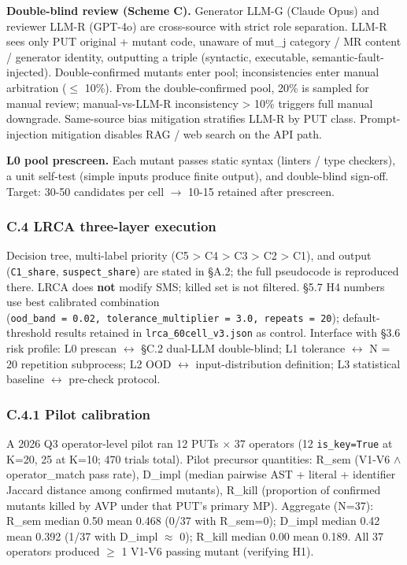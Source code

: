 \documentclass[review,12pt,authoryear]{elsarticle}
\begin{document}
\textbf{Double-blind review (Scheme C).} Generator LLM-G (Claude Opus)
and reviewer LLM-R (GPT-4o) are cross-source with strict role
separation. LLM-R sees only PUT original + mutant code, unaware of
mut\_j category / MR content / generator identity, outputting a triple
(syntactic, executable, semantic-fault-injected). Double-confirmed
mutants enter pool; inconsistencies enter manual arbitration ($\leq$ 10\%).
From the double-confirmed pool, 20\% is sampled for manual review;
manual-vs-LLM-R inconsistency \textgreater{} 10\% triggers full manual
downgrade. Same-source bias mitigation stratifies LLM-R by PUT class.
Prompt-injection mitigation disables RAG / web search on the API path.

\textbf{L0 pool prescreen.} Each mutant passes static syntax (linters /
type checkers), a unit self-test (simple inputs produce finite output),
and double-blind sign-off. Target: 30-50 candidates per cell $\to$ 10-15
retained after prescreen.

\subsubsection{C.4 LRCA three-layer execution}\label{c.4-lrca-three-layer-execution-full}

Decision tree, multi-label priority (C5 \textgreater{} C4 \textgreater{}
C3 \textgreater{} C2 \textgreater{} C1), and output (\texttt{C1\_share},
\texttt{suspect\_share}) are stated in §A.2; the full pseudocode is
reproduced there. LRCA does \textbf{not} modify SMS; killed set is not
filtered. §5.7 H4 numbers use best calibrated combination
(\texttt{ood\_band\ =\ 0.02,\ tolerance\_multiplier\ =\ 3.0,\ repeats\ =\ 20});
default-threshold results retained in \texttt{lrca\_60cell\_v3.json} as
control. Interface with §3.6 risk profile: L0 prescan $\leftrightarrow$ §C.2 dual-LLM
double-blind; L1 tolerance $\leftrightarrow$ N = 20 repetition subprocess; L2 OOD $\leftrightarrow$
input-distribution definition; L3 statistical baseline $\leftrightarrow$ pre-check
protocol.

\subsubsection{C.4.1 Pilot calibration}\label{c.4.1-pilot-calibration-37-operators-k-1020}

A 2026 Q3 operator-level pilot ran 12 PUTs $\times$ 37 operators (12
\texttt{is\_key=True} at K=20, 25 at K=10; 470 trials total). Pilot
precursor quantities: R\_sem (V1-V6 $\wedge$ operator\_match pass rate),
D\_impl (median pairwise AST + literal + identifier Jaccard distance
among confirmed mutants), R\_kill (proportion of confirmed mutants
killed by AVP under that PUT's primary MP). Aggregate (N=37): R\_sem
median 0.50 mean 0.468 (0/37 with R\_sem=0); D\_impl median 0.42 mean
0.392 (1/37 with D\_impl $\approx$ 0); R\_kill median 0.00 mean 0.189. All 37
operators produced $\geq$ 1 V1-V6 passing mutant (verifying H1).
\end{document}
